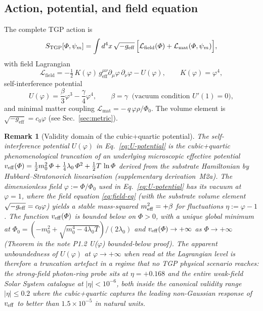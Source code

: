 \documentclass[11pt,a4paper]{article}
\renewcommand{\Phi}{\varPhi}
\newcommand{\PhiZero}{\varPhi_{0}}
\newtheorem{remark}[axiom]{Remark}
\begin{document}
\subsection{Action, potential, and field equation}

The complete TGP action is
\begin{equation}\label{eq:S-TGP}
  S_{\mathrm{TGP}}[\Phi,\psi_{m}]
  =\int d^{4}x\,\sqrt{-g_{\mathrm{eff}}}\,
    \Bigl[\mathcal{L}_{\mathrm{field}}(\Phi)
    +\mathcal{L}_{\mathrm{mat}}(\Phi,\psi_{m})\Bigr],
\end{equation}
with field Lagrangian
\begin{equation}\label{eq:L-field}
  \mathcal{L}_{\mathrm{field}}
  =-\tfrac{1}{2}\,K(\varphi)\,
    g_{\mathrm{eff}}^{\mu\nu}\partial_{\mu}\varphi\,\partial_{\nu}\varphi
  - U(\varphi),
  \qquad K(\varphi)=\varphi^{4},
\end{equation}
self-interference potential
\begin{equation}\label{eq:U-potential}
  U(\varphi)
  =\frac{\beta}{3}\varphi^{3}-\frac{\gamma}{4}\varphi^{4},
  \qquad \beta=\gamma
  \;\;\text{(vacuum condition $U'(1)=0$)},
\end{equation}
and minimal matter coupling
$\mathcal{L}_{\mathrm{mat}}=-\,q\,\varphi\rho/\PhiZero$. The volume element
is $\sqrt{-g_{\mathrm{eff}}}=c_{0}\varphi$ (see Sec.~\ref{sec:metric}).

\begin{remark}[Validity domain of the cubic+quartic potential]\label{rem:U-truncation}
The self-interference potential $U(\varphi)$ in
Eq.~\eqref{eq:U-potential} is the cubic+quartic phenomenological
truncation of an underlying microscopic effective potential
$v_{\rm eff}(\Phi)=\tfrac{1}{2}m_{0}^{2}\,\Phi+\tfrac{1}{4}\lambda_{0}\,\Phi^{2}+\tfrac{1}{2}T\,\ln\Phi$
derived from the substrate Hamiltonian by Hubbard--Stratonovich
linearisation (supplementary derivation~M2a). The dimensionless field
$\varphi:=\Phi/\PhiZero$ used in Eq.~\eqref{eq:U-potential} has its
vacuum at $\varphi=1$, where the field equation
\eqref{eq:field-eq} (with the substrate volume element
$\sqrt{-g_{\rm eff}}=c_{0}\varphi$) yields a stable mass-squared
$m_{\rm eff}^{2}=+\beta$ for fluctuations $\eta:=\varphi-1$.
The function $v_{\rm eff}(\Phi)$ is \emph{bounded below} on $\Phi>0$,
with a unique global minimum at
$\PhiZero=(-m_{0}^{2}+\sqrt{m_{0}^{4}-4\lambda_{0}T})/(2\lambda_{0})$
and $v_{\rm eff}(\Phi)\to+\infty$ as $\Phi\to+\infty$ (Theorem in the
note \emph{P1.2 U($\varphi$) bounded-below proof}). The apparent
unboundedness of $U(\varphi)$ at $\varphi\to+\infty$ when read at the
Lagrangian level is therefore a truncation artefact in a regime that
no TGP physical scenario reaches: the strong-field photon-ring probe
sits at $\eta=+0.168$ and the entire weak-field Solar System catalogue
at $|\eta|<10^{-6}$, both inside the canonical validity range
$|\eta|\le 0.2$ where the cubic+quartic captures the leading
non-Gaussian response of $v_{\rm eff}$ to better than $1.5\times10^{-5}$
in natural units.
\end{remark}
\end{document}
